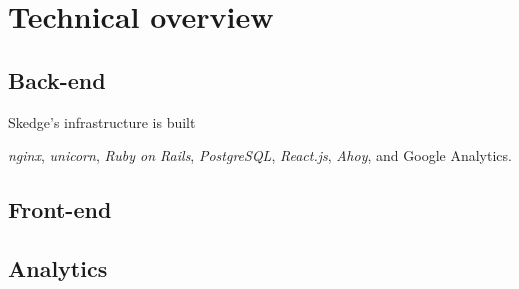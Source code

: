 
\chapter{Technical overview}

\section{Back-end}

Skedge's infrastructure is built 

\emph{nginx}, \emph{unicorn}, \emph{Ruby on Rails}, \emph{PostgreSQL}, \emph{React.js}, \emph{Ahoy}, and Google Analytics.

\section{Front-end}

\section{Analytics}